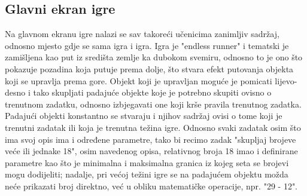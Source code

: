 \documentclass[times, utf8, zavrsni, numeric]{fer}
\begin{document}
		\subsection{Glavni ekran igre}
		Na glavnom ekranu igre nalazi se sav takoreći učenicima zanimljiv sadržaj, odnosno mjesto gdje se sama igra i igra. Igra je "endless runner" i tematski je zamišljena kao put iz središta zemlje ka dubokom svemiru, odnosno to je ono što pokazuje
		pozadina koja putuje prema dolje, što stvara efekt putovanja objekta koji se upravlja prema gore. Objekt koji je upravljan moguće je pomicati lijevo-desno i tako skupljati padajuće objekte koje je potrebno skupiti ovisno o trenutnom zadatku,
		odnosno izbjegavati one koji krše pravila trenutnog zadatka. Padajući objekti konstantno se stvaraju i njihov sadržaj ovisi o tome koji je trenutni zadatak ili koja je trenutna težina igre. Odnosno svaki zadatak osim što ima svoj opis ima i određene
		parametre, tako bi recimo zadak "skupljaj brojeve veće ili jednake 18", osim navedenog opisa, relativnog broja 18 imao i definirane parametre kao što je minimalna i maksimalna granica iz kojeg seta se brojevi mogu dodijeliti; nadalje, pri većoj 
		težini igre se na padajućem objektu možda neće prikazati broj direktno, već u obliku matematičke operacije, npr. "29 - 12".
\end{document}
